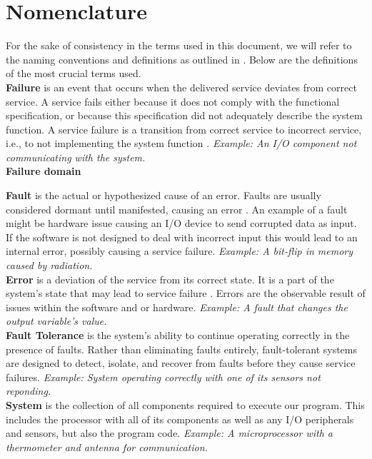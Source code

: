 \section{Nomenclature}

For the sake of consistency in the terms used in this document, we will refer to the naming conventions and definitions as outlined in \cite{1335465}. Below are the definitions of the most crucial terms used. \\

\textbf{Failure} is an event that occurs when the delivered service deviates from correct service. A service fails either because it does not comply with the functional specification, or because this specification did not adequately describe the system function. A service failure is a transition from correct service to incorrect service, i.e., to not implementing the system function \cite{1335465}.
\textit{Example: An I/O component not communicating with the system.} \\

\textbf{Failure domain}

\textbf{Fault} is the actual or hypothesized cause of an error. Faults are usually considered dormant until manifested, causing an error \cite{1335465}. An example of a fault might be hardware issue causing an I/O device to send corrupted data as input. If the software is not designed to deal with incorrect input this would lead to an internal error, possibly causing a service failure.
\textit{Example: A bit-flip in memory caused by radiation.} \\

\textbf{Error} is a deviation of the service from its correct state. It is a part of the system's state that may lead to service failure \cite{1335465}. Errors are the observable result of issues within the software and or hardware. 
\textit{Example: A fault that changes the output variable's value.} \\

\textbf{Fault Tolerance} is the system's ability to continue operating correctly in the presence of faults. Rather than eliminating faults entirely, fault-tolerant systems are designed to detect, isolate, and recover from faults before they cause service failures. 
\textit{Example: System operating correctly with one of its sensors not reponding.}\\

\textbf{System} is the collection of all components required to execute our program. This includes the processor with all of its components as well as any I/O peripherals and sensors, but also the program code.
\textit{Example: A microprocessor with a thermometer and antenna for communication.} \\

